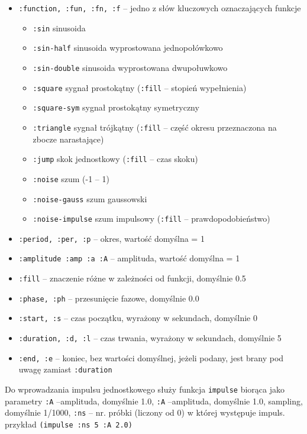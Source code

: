 \documentclass[12pt]{article}
\newcommand{\cljt}[1]{\texttt{#1}}
\begin{document}
\begin{itemize}
	\item \cljt{:function, :fun, :fn, :f} -- jedno z słów kluczowych oznaczających funkcje
	      \begin{itemize}
		      \item \cljt{:sin} sinusoida
		      \item \cljt{:sin-half} sinusoida wyprostowana jednopołówkowo
		      \item \cljt{:sin-double} sinusoida wyprostowana dwupołuwkowo
		      \item \cljt{:square} sygnał prostokątny (\cljt{:fill} -- stopień wypełnienia)
		      \item \cljt{:square-sym} sygnał prostokątny symetryczny
		      \item \cljt{:triangle} sygnał trójkątny (\cljt{:fill} -- część okresu przeznaczona na zbocze narastające)
		      \item \cljt{:jump} skok jednostkowy (\cljt{:fill} -- czas skoku)
		      \item \cljt{:noise} szum (-1 -- 1)
		      \item \cljt{:noise-gauss} szum gaussowski
		      \item \cljt{:noise-impulse} szum impulsowy (\cljt{:fill} -- prawdopodobieństwo)
	      \end{itemize}
	\item \cljt{:period, :per, :p} -- okres, wartość domyślna = 1
	\item \cljt{:amplitude :amp :a :A} -- amplituda, wartość domyślna = 1
	\item \cljt{:fill} -- znaczenie różne w zależności od funkcji, domyślnie 0.5

	\item \cljt{:phase, :ph} -- przesunięcie fazowe, domyślnie 0.0

	\item \cljt{:start, :s} -- czas początku, wyrażony w sekundach, domyślnie 0
	\item \cljt{:duration, :d, :l} -- czas trwania, wyrażony w sekundach, domyślnie 5
	\item \cljt{:end, :e} -- koniec, bez wartości domyślnej, jeżeli podany, jest brany pod uwagę zamiast \cljt{:duration}
\end{itemize}
Do wprowadzania impulsu jednostkowego służy funkcja \cljt{impulse} biorąca jako parametry \cljt{:A} --amplituda, domyślnie 1.0, \cljt{:A} --amplituda, domyślnie 1.0, sampling, domyślnie 1/1000,  \cljt{:ns} -- nr. próbki (liczony od 0) w której występuje impuls. przykład \cljt{(impulse :ns 5 :A 2.0)}
\end{document}
